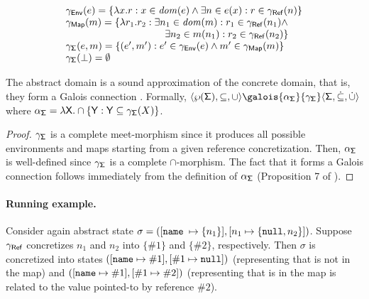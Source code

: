 \[
\begin{array}{l}
\gamma_\env(e) = \{\lambda x . r : x \in \dom{e} \land \exists n \in e(x) : r \in \gamma_\reference(n)\}\\
\gamma_\map(m) = \{\lambda r_1 . r_2 : \exists n_1 \in \dom{m} : r_1 \in \gamma_\reference(n_1) \land\\
\hspace{100pt} \exists n_2 \in m(n_1) : r_2 \in \gamma_\reference(n_2) \}\\
\gamma_\state(e, m) = \{(e', m') : e' \in \gamma_\env(e) \land m' \in \gamma_\map(m)\}\\
\gamma_\state(\bot) =\emptyset\\
\end{array}
\]
\begin{lemma}
	The abstract domain is a sound approximation of the concrete domain, that is, they form a Galois connection \cite{CC77}. Formally, $\langle \wp(\state), \subseteq, \cup \rangle \galois{\alpha_\state}{\gamma_\state} \langle \astate, \dot{\subseteq}, \dot{\cup} \rangle$ where $\alpha_{\mathsf{\Sigma}} = \lambda \mathsf{X} . \cap \{\mathsf{Y} : \mathsf{Y} \subseteq \gamma_{\mathsf{\Sigma}}(X)\}$.
\begin{proof}

$\gamma_{\mathsf{\Sigma}}$ is a complete meet-morphism since it produces all possible environments and maps starting from a given reference concretization. Then, $\alpha_{\mathsf{\Sigma}}$ is well-defined since $\gamma_{\mathsf{\Sigma}}$ is a complete $\cap$-morphism. The fact that it forms a Galois connection follows immediately from the definition of $\alpha_{\mathsf{\Sigma}}$ (Proposition 7 of \cite{CC92}).
\end{proof}
\end{lemma}

\paragraph{Running example.} Consider again abstract state $\sigma = ([\mathtt{name}$ $\mapsto \{n_1\}], [n_1 \mapsto \{\mathtt{null}, n_2\}])$. Suppose $\gamma_{\mathsf{Ref}}$ concretizes $n_1$ and $n_2$ into $\{\#1\}$ and $\{\#2\}$, respectively. Then $\sigma$ is concretized into states $([\mathtt{name} \mapsto \#1], [\#1 \mapsto \mathtt{null}])$ (representing that  is not in the map) and $([\mathtt{name} \mapsto \#1], [\#1 \mapsto \#2])$ (representing that  is in the map is related to the value pointed-to by reference $\#2$).



